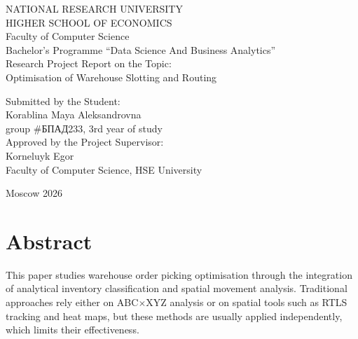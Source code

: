 \documentclass[12pt,a4paper]{article}
\begin{document}
\begin{titlepage}
  \begin{center}
    NATIONAL RESEARCH UNIVERSITY\\
    HIGHER SCHOOL OF ECONOMICS\\[1em]
    Faculty of Computer Science\\
    Bachelor's Programme ``Data Science And Business Analytics''\\[4em]

    Research Project Report on the Topic:\\[1em]
    Optimisation of Warehouse Slotting and Routing\\[5em]

    \begin{flushleft}
      Submitted by the Student:\\[0.5em]
      Korablina Maya Aleksandrovna\\
      group \#БПАД233, 3rd year of study\\[2em]

      Approved by the Project Supervisor:\\[0.5em]
      Korneluyk Egor\\
      Faculty of Computer Science, HSE University
    \end{flushleft}

    \vfill
    Moscow 2026
  \end{center}
\end{titlepage}

\tableofcontents
\newpage

\section*{Abstract}

This paper studies warehouse order picking optimisation through the integration of
analytical inventory classification and spatial movement analysis. Traditional approaches
rely either on ABC$\times$XYZ analysis or on spatial tools such as RTLS tracking and
heat maps, but these methods are usually applied independently, which limits their
effectiveness.
\end{document}

